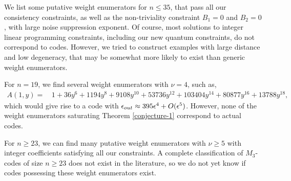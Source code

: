 \documentclass[11pt]{article}
\begin{document}
We list some putative weight enumerators for $n \leq 35$, that pass all our consistency constraints, as well as the non-triviality constraint $B_1=0$ and $B_2=0$, with large noise suppression exponent. Of course, most solutions to integer linear programming constraints, including our new quantum constraints, do not correspond to codes. However, we tried to construct examples with large distance and low degeneracy, that may be somewhat more likely to exist than generic weight enumerators. 

For $n=19$, we find several weight enumerators with $\nu=4$, such as, 
\begin{equation}
\begin{aligned}
    A(1, y) = & \, 1 + 36 y^6 + 1194 y^8 + 9108 y^{10} + 53736 y^{12} + 103404 y^{14} + 
 80877 y^{16} + 13788 y^{18},
\end{aligned}
\end{equation}
which would give rise to a code with $\epsilon_{\rm out} \approx  395 \epsilon^4 +O(\epsilon^5)$. However, none of the weight enumerators saturating Theorem \ref{conjecture-1} correspond to actual codes.


For $n \geq 23$, we can find many putative weight enumerators with $\nu \geq 5$  with integer coefficients satisfying all our constraints. A complete classification of $M_3$-codes of size $n \geq 23$ does not exist in the literature, so we do not yet know if codes possessing these weight enumerators exist.
\end{document}
